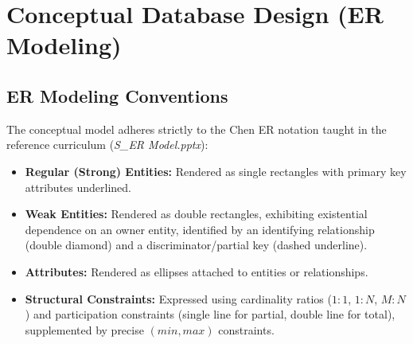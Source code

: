 \documentclass[12pt,a4paper]{report}
\begin{document}
\chapter{Conceptual Database Design (ER Modeling)}

\section{ER Modeling Conventions}
The conceptual model adheres strictly to the Chen ER notation taught in the reference curriculum (\textit{S\_ER Model.pptx}):
\begin{itemize}
    \item \textbf{Regular (Strong) Entities:} Rendered as single rectangles with primary key attributes underlined.
    \item \textbf{Weak Entities:} Rendered as double rectangles, exhibiting existential dependence on an owner entity, identified by an identifying relationship (double diamond) and a discriminator/partial key (dashed underline).
    \item \textbf{Attributes:} Rendered as ellipses attached to entities or relationships.
    \item \textbf{Structural Constraints:} Expressed using cardinality ratios ($1:1$, $1:N$, $M:N$) and participation constraints (single line for partial, double line for total), supplemented by precise $(min, max)$ constraints.
\end{itemize}
\end{document}
